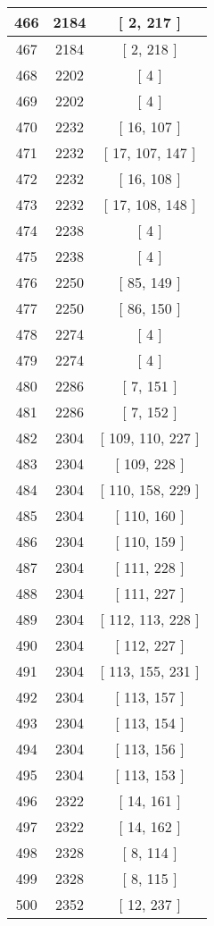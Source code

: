 \begin{center}
\begin{longtable}[H]{|| c c c ||}
\hline
466 & 2184 & [ 2, 217 ] \\ 
\hline
467 & 2184 & [ 2, 218 ] \\ 
\hline
468 & 2202 & [ 4 ] \\ 
\hline
469 & 2202 & [ 4 ] \\ 
\hline
470 & 2232 & [ 16, 107 ] \\ 
\hline
471 & 2232 & [ 17, 107, 147 ] \\ 
\hline
472 & 2232 & [ 16, 108 ] \\ 
\hline
473 & 2232 & [ 17, 108, 148 ] \\ 
\hline
474 & 2238 & [ 4 ] \\ 
\hline
475 & 2238 & [ 4 ] \\ 
\hline
476 & 2250 & [ 85, 149 ] \\ 
\hline
477 & 2250 & [ 86, 150 ] \\ 
\hline
478 & 2274 & [ 4 ] \\ 
\hline
479 & 2274 & [ 4 ] \\ 
\hline
480 & 2286 & [ 7, 151 ] \\ 
\hline
481 & 2286 & [ 7, 152 ] \\ 
\hline
482 & 2304 & [ 109, 110, 227 ] \\ 
\hline
483 & 2304 & [ 109, 228 ] \\ 
\hline
484 & 2304 & [ 110, 158, 229 ] \\ 
\hline
485 & 2304 & [ 110, 160 ] \\ 
\hline
486 & 2304 & [ 110, 159 ] \\ 
\hline
487 & 2304 & [ 111, 228 ] \\ 
\hline
488 & 2304 & [ 111, 227 ] \\ 
\hline
489 & 2304 & [ 112, 113, 228 ] \\ 
\hline
490 & 2304 & [ 112, 227 ] \\ 
\hline
491 & 2304 & [ 113, 155, 231 ] \\ 
\hline
492 & 2304 & [ 113, 157 ] \\ 
\hline
493 & 2304 & [ 113, 154 ] \\ 
\hline
494 & 2304 & [ 113, 156 ] \\ 
\hline
495 & 2304 & [ 113, 153 ] \\ 
\hline
496 & 2322 & [ 14, 161 ] \\ 
\hline
497 & 2322 & [ 14, 162 ] \\ 
\hline
498 & 2328 & [ 8, 114 ] \\ 
\hline
499 & 2328 & [ 8, 115 ] \\ 
\hline
500 & 2352 & [ 12, 237 ] \\ 

\end{longtable}
\end{center}
